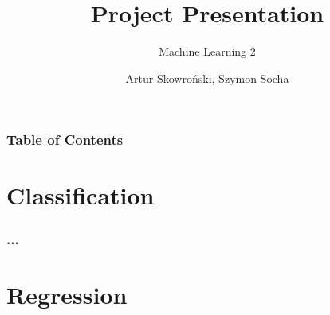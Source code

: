 \documentclass[8pt]{beamer}
\title[Machine-Learining-2\_Project-Presentation\_AS-SS] %
{Project Presentation}
\subtitle{Machine Learning 2}
\author[Artur Skowroński, Szymon Socha] %
{Artur Skowroński, Szymon Socha}
\date[date] %
\begin{document}
\frame{\titlepage}


\begin{frame}
\frametitle{Table of Contents}
\tableofcontents
\end{frame}


\section{Classification}

\begin{frame}
\frametitle{...}

\end{frame}



\section{Regression}
\end{document}
